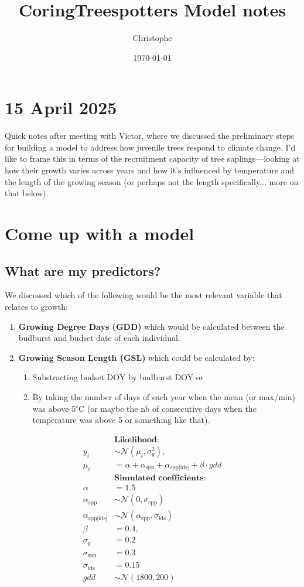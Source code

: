\documentclass[a4paper,12pt]{article}
\title{CoringTreespotters Model notes}
\author{Christophe}
\date{\today}
\begin{document}
\maketitle

\section*{15 April 2025}
Quick notes after meeting with Victor, where we discussed the preliminary steps for building a model to address how juvenile trees respond to climate change. I’d like to frame this in terms of the recruitment capacity of tree saplings—looking at how their growth varies across years and how it’s influenced by temperature and the length of the growing season (or perhaps not the length specifically... more on that below).

\section{Come up with a model}

\subsection*{What are my predictors?}
We discussed which of the following would be the most relevant variable that relates to growth:
\begin{enumerate}
	\item \textbf{Growing Degree Days (GDD)} which would be calculated between the budburst and budset date of each individual. 
	\item \textbf{Growing Season Length (GSL)} which could be calculated by:
	\begin{enumerate}
		\item Substracting budset DOY by budburst DOY or 
		\item By taking the number of days of each year when the mean (or max/min) was above 5$^{\circ}$C (or maybe the nb of consecutive days when the temperature was above 5 or something like that).
	\end{enumerate}
\end{enumerate}

\[
\begin{aligned}
&\textbf{Likelihood:} \\
y_{i} &\sim \mathcal{N}(\mu_{i}, \sigma_y^2), \\
\mu_{i} &= \alpha + \alpha_{\text{spp}} + \alpha_{\text{spp[ids]}} + \beta \cdot gdd \\[1em]
&\textbf{Simulated coefficients:} \\
\alpha & = 1.5 \\
\alpha_{\text{spp}} &\sim \mathcal{N}(0, \sigma_{\text{spp}}) \\
\alpha_{\text{spp[ids]}} &\sim \mathcal{N}(\alpha_{\text{spp}}, \sigma_{\text{ids}}) \\
\beta & = 0.4, \\
\sigma_{y} &= 0.2 \\
\sigma_{\text{spp}} & = 0.3\\
\sigma_{\text{ids}} & = 0.15 \\
gdd & \sim \mathcal{N}(1800, 200) 
\end{aligned}
\]
\end{document}
